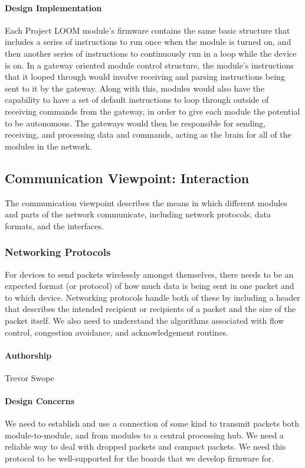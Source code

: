 \documentclass[onecolumn, draftclsnofoot,10pt, compsoc]{IEEEtran}
\begin{document}
\paragraph{Design Implementation}
    Each Project LOOM module's firmware contains the same basic structure that includes a series of instructions to run once when the module is turned on, and then another series of instructions to continuously run in a loop while the device is on. In a gateway oriented module control structure, the module's instructions that it looped through would involve receiving and parsing instructions being sent to it by the gateway. Along with this, modules would also have the capability to have a set of default instructions to loop through outside of receiving commands from the gateway, in order to give each module the potential to be autonomous. The gateways would then be responsible for sending, receiving, and processing data and commands, acting as the brain for all of the modules in the network. 






\subsection{Communication Viewpoint: Interaction}
    The communication viewpoint describes the means in which different modules and parts of the network communicate, including network protocols, data formats, and the interfaces.

\subsubsection{Networking Protocols}
    For devices to send packets wirelessly amongst themselves, there needs to be an expected format (or protocol) of how much data is being sent in one packet and to which device. Networking protocols handle both of these by including a header that describes the intended recipient or recipients of a packet and the size of the packet itself. We also need to understand the algorithms associated with flow control, congestion avoidance, and acknowledgement routines.

\paragraph{Authorship}
    Trevor Swope

\paragraph{Design Concerns}
    We need to establish and use a connection of some kind to transmit packets both module-to-module, and from modules to a central processing hub. We need a reliable way to deal with dropped packets and compact packets. We need this protocol to be well-supported for the boards that we develop firmware for.
\end{document}
